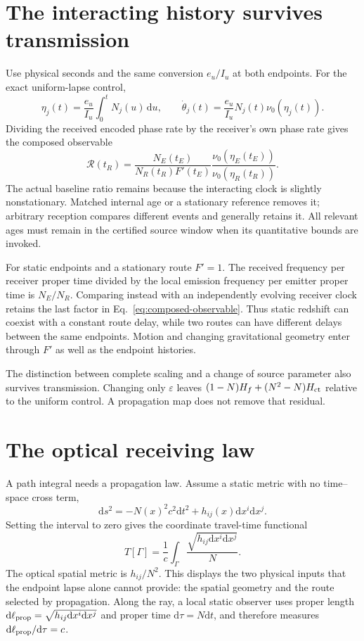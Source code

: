 \documentclass[10pt,twocolumn,letterpaper]{article}
\newcommand{\dd}{\mathrm{d}}
\begin{document}
\section{The interacting history survives transmission}
Use physical seconds and the same conversion $e_u/I_u$ at both endpoints. For the exact uniform-lapse control,
\[
 \eta_j(t)=\frac{e_u}{I_u}\int_0^t N_j(u)\,\dd u,\qquad
 \dot\theta_j(t)=\frac{e_u}{I_u}N_j(t)\nu_0(\eta_j(t)).
\]
Dividing the received encoded phase rate by the receiver's own phase rate gives the composed observable
\begin{equation}
 \mathcal R(t_R)=
 \frac{N_E(t_E)}{N_R(t_R)F'(t_E)}
 \frac{\nu_0(\eta_E(t_E))}{\nu_0(\eta_R(t_R))}.
 \label{eq:composed-observable}
\end{equation}
The actual baseline ratio remains because the interacting clock is slightly nonstationary. Matched internal age or a stationary reference removes it; arbitrary reception compares different events and generally retains it. All relevant ages must remain in the certified source window when its quantitative bounds are invoked.

For static endpoints and a stationary route $F'=1$. The received frequency per receiver proper time divided by the local emission frequency per emitter proper time is $N_E/N_R$. Comparing instead with an independently evolving receiver clock retains the last factor in Eq.~\eqref{eq:composed-observable}. Thus static redshift can coexist with a constant route delay, while two routes can have different delays between the same endpoints. Motion and changing gravitational geometry enter through $F'$ as well as the endpoint histories.

The distinction between complete scaling and a change of source parameter also survives transmission. Changing only $\varepsilon$ leaves $(1-N)H_f+(N^2-N)H_{\rm ct}$ relative to the uniform control. A propagation map does not remove that residual.


\section{The optical receiving law}
A path integral needs a propagation law. Assume a static metric with no time--space cross term,
\[
 \dd s^2=-N(x)^2c^2\dd t^2+h_{ij}(x)\dd x^i\dd x^j.
\]
Setting the interval to zero gives the coordinate travel-time functional
\[
 T[\Gamma]=\frac 1c\int_\Gamma\frac{\sqrt{h_{ij}\dd x^i\dd x^j}}{N}.
\]
The optical spatial metric is $h_{ij}/N^2$. This displays the two physical inputs that the endpoint lapse alone cannot provide: the spatial geometry and the route selected by propagation. Along the ray, a local static observer uses proper length $\dd\ell_{\rm prop}=\sqrt{h_{ij}\dd x^i\dd x^j}$ and proper time $\dd\tau=N\dd t$, and therefore measures $\dd\ell_{\rm prop}/\dd\tau=c$.
\end{document}
